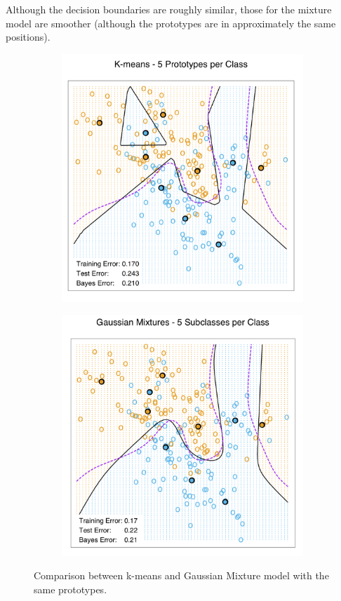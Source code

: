 \documentclass[12pt, letterpaper]{article}
\theoremstyle{definition}
\begin{document}
Although the decision boundaries are roughly similar, those for the mixture model are smoother (although the prototypes are in approximately the same positions). 

\begin{figure}
\begin{subfigure}{0.49\textwidth}
\centering
\includegraphics[width=1\linewidth]{img/kmeans}
\end{subfigure}
\hfill
\begin{subfigure}{0.49\textwidth}
\centering
\includegraphics[width=1\linewidth]{img/GaussianMix}
\end{subfigure}
\caption{Comparison between k-means and Gaussian Mixture model with the same prototypes.}
\end{figure}
\end{document}
